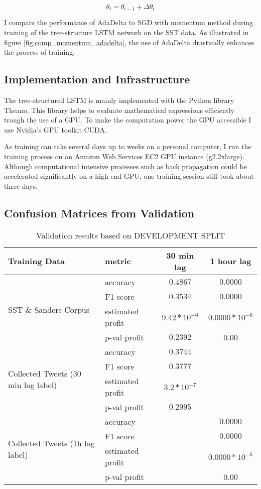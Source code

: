 \documentclass[a4paper,12pt]{article}%
\begin{document}
$$
\theta_t = \theta_{t-1} + \Delta \theta_t 
$$

I compare the performance of AdaDelta to SGD with momentum method during training of the tree-structure LSTM network on the SST data. As illustrated in figure \ref{fig:comp_momentum_adadelta}, the use of AdaDelta drastically enhances the process of training.


\subsection{Implementation and Infrastructure}
The tree-structured LSTM is mainly implemented with the Python library Theano. This library helps to evaluate mathematical expressions efficiently trough the use of a GPU. To make the computation power the GPU accessible I use Nvidia's GPU toolkit CUDA.

As training can take several days up to weeks on a personal computer, I run the training process on an Amazon Web Services EC2 GPU instance (g2.2xlarge). Although computational intensive processes such as back propagation could be accelerated significantly on a high-end GPU, one training session still took about three days.

\subsection{Confusion Matrices from Validation}
\begin{table}
\centering
\captionsetup{justification=centering}
\begin{tabular}{ |l|l|c|c| }
\hline
Training Data & metric & 30 min lag & 1 hour lag \\ \hline
\multirow{4}{*}{SST \& Sanders Corpus} & accuracy & $0.4867$ & $0.0000$ \\
 & F1 score & $0.3534$ & $0.0000$ \\
 & estimated profit & $9.42* 10^{-6}$ & $0.0000* 10^{-6}$ \\
 & p-val profit & $0.2392$ & 0.00 \\ \hline
\multirow{4}{*}{Collected Tweets (30 min lag label)} & accuracy & $0.3744$ & \\
 & F1 score & $0.3777$ &  \\
 & estimated profit & $3.2 * 10^{-7}$ & \\
 & p-val profit & $0.2995$ &  \\ \hline
\multirow{4}{*}{Collected Tweets (1h lag label)} & accuracy & & $0.0000$  \\
 & F1 score & & $0.0000$ \\
 & estimated profit & & $0.0000* 10^{-6}$ \\
 & p-val profit & & 0.00 \\ \hline
\end{tabular}
\caption{Validation results based on DEVELOPMENT SPLIT\label{table:tree_lstm_validation}}
\end{table}
\end{document}
